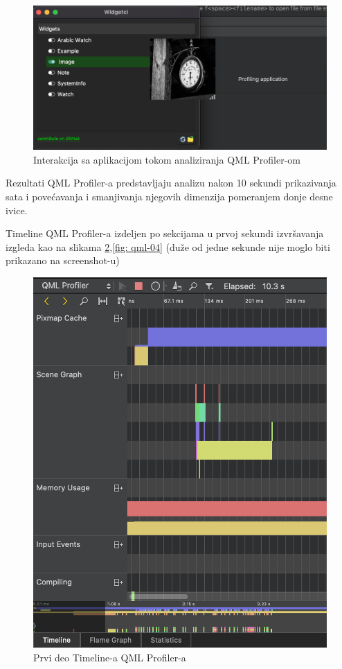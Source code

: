 \documentclass[a4paper]{article}
\begin{document}
\begin{figure}[h!]
\begin{center}
\includegraphics[scale=0.40]{qml-prof-02.png}
\end{center}
\caption{Interakcija sa aplikacijom tokom analiziranja QML Profiler-om}
\label{fig: qml-02}
\end{figure}

Rezultati QML Profiler-a predstavljaju analizu nakon 10 sekundi prikazivanja sata i povećavanja i smanjivanja njegovih dimenzija pomeranjem donje desne ivice.

Timeline QML Profiler-a izdeljen po sekcijama u prvoj sekundi izvršavanja izgleda kao na slikama \ref{fig: qml-03},\ref{fig: qml-04}  (duže od jedne sekunde nije moglo biti prikazano na screenshot-u)

\begin{figure}[h!]
\begin{center}
\includegraphics[scale=0.40]{qml-prof-03.png}
\end{center}
\caption{Prvi deo Timeline-a QML Profiler-a}
\label{fig: qml-03}
\end{figure}
\end{document}
